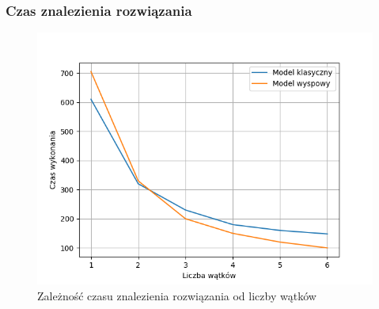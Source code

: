 \documentclass{beamer}
\begin{document}
\begin{frame}
\frametitle{Czas znalezienia rozwiązania}
\begin{figure}[ht]
    \centering
    \includegraphics[scale=0.5]{time_threads_compare.png}
    \caption{Zależność czasu znalezienia rozwiązania od liczby wątków}
\end{figure}    
\end{frame}
\end{document}
